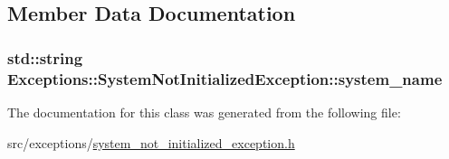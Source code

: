 \subsection{Member Data Documentation}
\hypertarget{class_exceptions_1_1_system_not_initialized_exception_a5649bbb869394d52f7c8aa82d600d070}{}
\subsubsection[{system\+\_\+name}]{\setlength{\rightskip}{0pt plus 5cm}std\+::string Exceptions\+::\+System\+Not\+Initialized\+Exception\+::system\+\_\+name\hspace{0.3cm}{\ttfamily [private]}}\label{class_exceptions_1_1_system_not_initialized_exception_a5649bbb869394d52f7c8aa82d600d070}


The documentation for this class was generated from the following file\+:\begin{DoxyCompactItemize}
\item 
src/exceptions/\hyperlink{system__not__initialized__exception_8h}{system\+\_\+not\+\_\+initialized\+\_\+exception.\+h}\end{DoxyCompactItemize}
